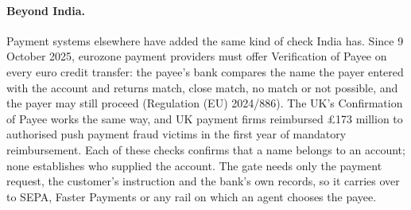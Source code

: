 \paragraph{Beyond India.} Payment systems elsewhere have added the same kind of check India has. Since 9 October 2025,
eurozone payment providers must offer Verification of Payee on every euro credit transfer: the payee's bank compares the
name the payer entered with the account and returns match, close match, no match or not possible, and the payer may still
proceed (Regulation (EU) 2024/886). The UK's Confirmation of Payee works the same way, and UK payment firms reimbursed
\pounds173 million to authorised push payment fraud victims in the first year of mandatory reimbursement. Each of these
checks confirms that a name belongs to an account; none establishes who supplied the account. The gate needs only the
payment request, the customer's instruction and the bank's own records, so it carries over to SEPA, Faster Payments or any
rail on which an agent chooses the payee.

